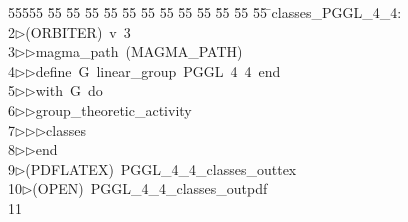 %
%
\begin{tabbing}
55555 \= 55 \= 55 \= 55 \= 55 \= 55 \= 55 \= 55 \= 55 \= 55 \= 55 \= 55 \= 55 \= \>classes\_PGGL\_4\_4:\\[0pt]
2\>$\triangleright$\>(ORBITER)\ v\ 3\ \\[0pt]
3\>$\triangleright$\>$\triangleright$\>magma\_path\ (MAGMA\_PATH)\ \\[0pt]
4\>$\triangleright$\>$\triangleright$\>define\ G\ linear\_group\ PGGL\ 4\ 4\ end\ \\[0pt]
5\>$\triangleright$\>$\triangleright$\>with\ G\ do\ \\[0pt]
6\>$\triangleright$\>$\triangleright$\>group\_theoretic\_activity\ \\[0pt]
7\>$\triangleright$\>$\triangleright$\>$\triangleright$\>classes\ \\[0pt]
8\>$\triangleright$\>$\triangleright$\>end\\[0pt]
9\>$\triangleright$\>(PDFLATEX)\ PGGL\_4\_4\_classes\_outtex\\[0pt]
10\>$\triangleright$\>(OPEN)\ PGGL\_4\_4\_classes\_outpdf\\[0pt]
11\>\end{tabbing}
